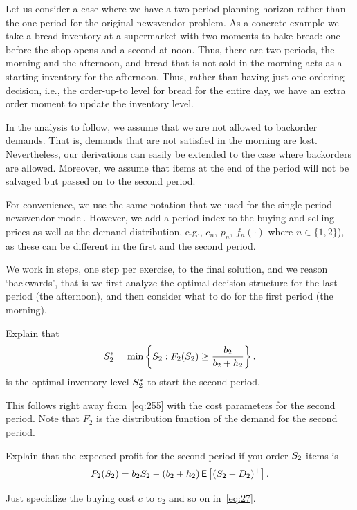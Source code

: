 Let us consider a case where we have a two-period planning horizon rather than the one period for the original newsvendor problem. As a concrete example we take a bread inventory at a supermarket with two moments to bake bread: one before the shop opens and a second at noon. Thus, there are two periods, the morning and the afternoon, and bread that is not sold in the morning acts as a starting inventory for the afternoon. Thus, rather than having just one ordering decision, i.e., the order-up-to level for bread for the entire day, we have an extra order moment to update the inventory level.


In the analysis to follow, we assume that we are not allowed to backorder demands. That is, demands that are not satisfied in the morning are lost. Nevertheless, our derivations can easily be extended to the case where backorders are allowed.  Moreover, we assume that items at the end of the period will not be salvaged but passed on to the second period.

For convenience, we use the same notation that we used for the single-period newsvendor model. However, we add a period index to the buying and selling prices as well as the demand distribution, e.g.,  $c_n$, $p_{n}$, $f_n(\cdot)$ where $n\in\{1,2\}$), as these can be different in the first and the second period. 

We work in steps, one step per exercise, to the final solution, and we reason `backwards', that is we first analyze the optimal decision structure for the last period (the afternoon), and then consider what to do for the first period (the morning).


\begin{exercise} Explain that 
\begin{align*}
S^*_2 = \min\left\{S_2 : F_2(S_2)\geq \frac{b_2}{b_2+h_2}\right\}.
\end{align*}
is the optimal inventory level $S_2^*$ to  start the second period.
\begin{solution}
This follows right away from~\eqref{eq:255} with the cost parameters for the second period. Note that  $F_2$ is the distribution function of the demand for the second period.
\end{solution}
\end{exercise}


\begin{exercise}
Explain that the  expected profit for the second period if you order $S_2$ items is
\begin{align}\label{eq:28}
P_2(S_2) = b_2 S_2 - (b_2+h_2)\,\mathsf{E}\left[(S_2-D_2)^+\right].
\end{align}
\begin{solution}
Just specialize the buying cost $c$ to $c_2$ and so on in~\eqref{eq:27}.
\end{solution}
\end{exercise}

